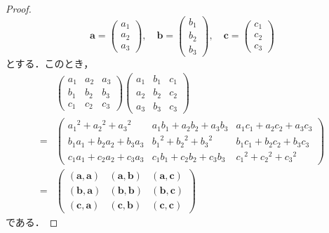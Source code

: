 \documentclass[a4paper,10pt,fleqn]{ltjsarticle}
\begin{document}
\begin{tleftbar}
  \begin{proof}
    \[
      \bm{a}=\begin{pmatrix} a_1 \\ a_2 \\ a_3 \end{pmatrix},\quad \bm{b}=\begin{pmatrix} b_1 \\ b_2 \\ b_3 \end{pmatrix},\quad \bm{c}=\begin{pmatrix} c_1 \\ c_2 \\ c_3 \end{pmatrix}
    \]
    とする．このとき，
    \begin{align*}
        &
      \begin{pmatrix}
        a_1 & a_2 & a_3 \\
        b_1 & b_2 & b_3 \\
        c_1 & c_2 & c_3
      \end{pmatrix}
      \begin{pmatrix}
        a_1 & b_1 & c_1 \\
        a_2 & b_2 & c_2 \\
        a_3 & b_3 & c_3
      \end{pmatrix}
      \\
      = & \begin{pmatrix}
            {a_1}^2 +{a_2}^2 +{a_3}^2   & a_1 b_1 + a_2 b_2 + a_3 b_3 & a_1 c_1 + a_2 c_2 + a_3 c_3 \\
            b_1 a_1 + b_2 a_2 + b_3 a_3 & {b_1}^2 +{b_2}^2 + {b_3}^2  & b_1 c_1 + b_2 c_2 + b_3 c_3 \\
            c_1 a_1 + c_2 a_2 + c_3 a_3 & c_1 b_1 + c_2 b_2 + c_3 b_3 & {c_1}^2 +{c_2}^2 +{c_3}^2
          \end{pmatrix}
      \\
      = & \begin{pmatrix}
            (\bm{a},\bm{a}) & (\bm{a},\bm{b}) & (\bm{a},\bm{c}) \\
            (\bm{b},\bm{a}) & (\bm{b},\bm{b}) & (\bm{b},\bm{c}) \\
            (\bm{c},\bm{a}) & (\bm{c},\bm{b}) & (\bm{c},\bm{c})
          \end{pmatrix}
    \end{align*}
    である．


\end{proof}
\end{tleftbar}
\end{document}
